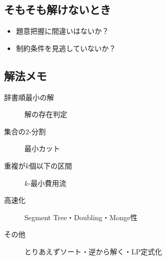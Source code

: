 \documentclass{jsarticle}
\begin{document}
\subsection*{そもそも解けないとき}

\begin{itemize}
\item 題意把握に間違いはないか？
\item 制約条件を見逃していないか？
\end{itemize}

\subsection*{解法メモ}

\begin{description}
\item[辞書順最小の解] 解の存在判定
\item[集合の$2$-分割] 最小カット
\item[重複が$k$個以下の区間] $k$-最小費用流
\item[高速化] Segment Tree・Doubling・Monge性
\item[その他] とりあえずソート・逆から解く・LP定式化
\end{description}
\end{document}
